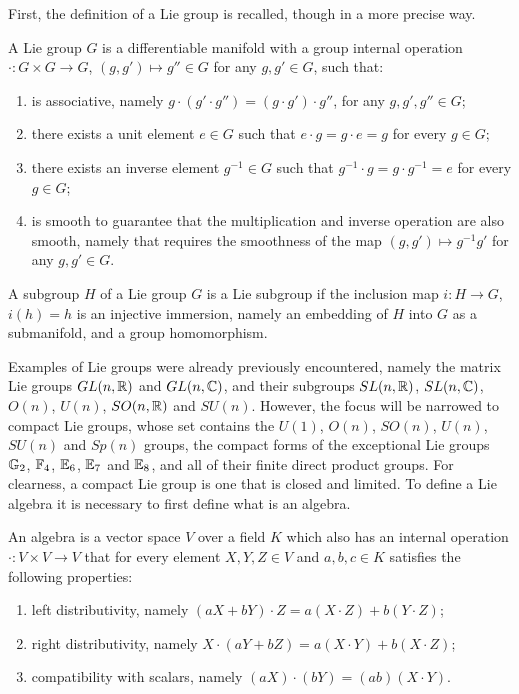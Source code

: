 First, the definition of a Lie group is recalled, though in a more precise way.
\begin{defn}
    A Lie group $G$ is a differentiable manifold with a group internal operation $\cdot : G \times G \to G$, $(g,g') \mapsto g'' \in G$ for any $g,g' \in G$, such that:
    \begin{enumerate}
        \item is associative, namely $g\cdot(g'\cdot g'') = (g\cdot g')\cdot g''$, for any $g,g',g'' \in G$;
        \item there exists a unit element $e \in G$ such that $e\cdot g = g\cdot e = g$ for every $g \in G$;
        \item there exists an inverse element $g^{-1} \in G$ such that $g^{-1}\cdot g = g\cdot g^{-1} = e$ for every $g \in G$;
        \item is smooth to guarantee that the multiplication and inverse operation are also smooth, namely that requires the smoothness of the map $(g,g') \mapsto g^{-1}g'$ for any $g,g' \in G$.
    \end{enumerate}
\end{defn}
\begin{defn}
    A subgroup $H$ of a Lie group $G$ is a Lie subgroup if the inclusion map $i : H \to G$, $i(h) = h$ is an injective immersion, namely an embedding of $H$ into $G$ as a submanifold, and a group homomorphism.
\end{defn}
Examples of Lie groups were already previously encountered, namely the matrix Lie groups $GL(n,\mathbb{R})$ and $GL(n,\mathbb{C})$, and their subgroups $SL(n,\mathbb{R})$, $SL(n,\mathbb{C})$, $O(n)$, $U(n)$, $SO(n,\mathbb{R})$ and $SU(n)$. However, the focus will be narrowed to compact Lie groups, whose set contains the $U(1)$, $O(n)$, $SO(n)$, $U(n)$, $SU(n)$ and $Sp(n)$ groups, the compact forms of the exceptional Lie groups $\mathbb{G}_2$, $\mathbb{F}_4$, $\mathbb{E}_6$, $\mathbb{E}_7$ and $\mathbb{E}_8$, and all of their finite direct product groups. For clearness, a compact Lie group is one that is closed and limited. To define a Lie algebra it is necessary to first define what is an algebra. 
\begin{defn}[algebra]
    An algebra is a vector space $V$ over a field $K$ which also has an internal operation $\cdot : V \times V \to V$ that for every element $X,Y,Z \in V$ and $a,b,c \in K$ satisfies the following properties:
    \begin{enumerate}
        \item left distributivity, namely $(aX + bY)\cdot Z = a(X \cdot Z) + b(Y\cdot Z)$;
        \item right distributivity, namely $X \cdot (aY + bZ) = a(X\cdot Y) + b(X \cdot Z)$;
        \item compatibility with scalars, namely $(aX)\cdot(bY) = (ab)(X \cdot Y)$.
    \end{enumerate}
\end{defn}
